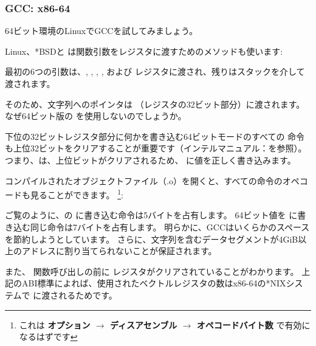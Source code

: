 \subsubsection{GCC: x86-64}

64ビット環境のLinuxでGCCを試してみましょう。



Linux、*BSDと \MacOSX は関数引数をレジスタに渡すためのメソッドも使います: \SysVABI{}

最初の6つの引数は、\RDI, \RSI, \RDX, \RCX,  および レジスタに渡され、残りはスタックを介して渡されます。

そのため、文字列へのポインタは \EDI （レジスタの32ビット部分）に渡されます。 なぜ64ビット版の \RDI を使用しないのでしょうか。

下位の32ビットレジスタ部分に何かを書き込む64ビットモードのすべての \MOV 命令も上位32ビットをクリアすることが重要です（インテルマニュアル：を参照）。 つまり、は、上位ビットがクリアされるため、 \RAX に値を正しく書き込みます。

コンパイルされたオブジェクトファイル（.o）を開くと、すべての命令のオペコードも見ることができます。
\footnote{これは \textbf{オプション $\rightarrow$ ディスアセンブル $\rightarrow$ オペコードバイト数} で有効になるはずです}:



\label{hw_EDI_instead_of_RDI}
ご覧のように、の \EDI に書き込む命令は5バイトを占有します。 
64ビット値を \RDI に書き込む同じ命令は7バイトを占有します。 
明らかに、GCCはいくらかのスペースを節約しようとしています。 
さらに、文字列を含むデータセグメントが4\gls{GiB}以上のアドレスに割り当てられないことが保証されます。

\label{SysVABI_input_EAX}
また、 \printf 関数呼び出しの前に \EAX レジスタがクリアされていることがわかります。 
上記の\ac{ABI}標準によれば、使用されたベクトルレジスタの数はx86-64の*NIXシステムで \EAX に渡されるためです。
